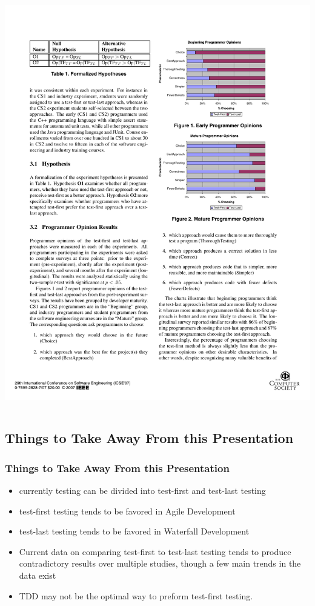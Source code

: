 \documentclass{beamer}
\begin{document}
\begin{frame}
\begin{columns}
\begin{column}{.5\textwidth}
\includegraphics[scale=.75]{janzengraph2.pdf}
\\
\end{column}
\end{columns}
\end{frame}

\subsection{Things to Take Away From this Presentation}
\begin{frame}
\frametitle{Things to Take Away From this Presentation}
\begin{itemize}
\item currently testing can be divided into test-first and test-last testing
\item test-first testing tends to be favored in Agile Development
\item test-last testing tends to be favored in Waterfall Development
\item Current data on comparing test-first to test-last testing tends to produce contradictory results over multiple studies, though a few main trends in the data exist
\item TDD may not be the optimal way to preform test-first testing.
\end{itemize}

\end{frame}
\end{document}
